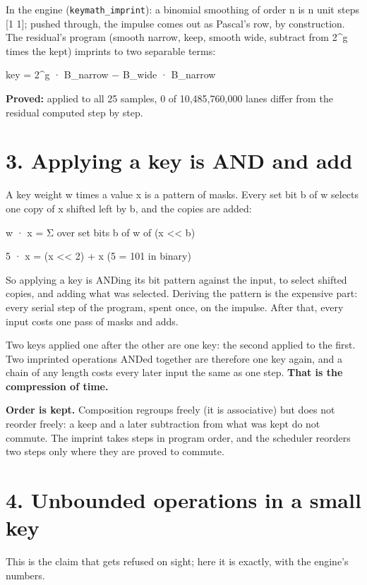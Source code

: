 In the engine (\texttt{keymath\_\allowbreak{}imprint}): a binomial smoothing of order n is n unit steps [1 1]; pushed through, the impulse comes out as Pascal's row, by construction. The residual's program (smooth narrow, keep, smooth wide, subtract from 2\textasciicircum{}g times the kept) imprints to two separable terms:

key = 2\textasciicircum{}g · B\_\allowbreak{}narrow − B\_\allowbreak{}wide · B\_\allowbreak{}narrow

\textbf{Proved:} applied to all 25 samples, 0 of 10,485,760,000 lanes differ from the residual computed step by step.

\section{\texorpdfstring{3. Applying a key is AND and add}{3. Applying a key is AND and add}}

A key weight w times a value x is a pattern of masks. Every set bit b of w selects one copy of x shifted left by b, and the copies are added:

w · x = Σ over set bits b of w of (x << b)

5 · x = (x << 2) + x         (5 = 101 in binary)

So applying a key is ANDing its bit pattern against the input, to select shifted copies, and adding what was selected. Deriving the pattern is the expensive part: every serial step of the program, spent once, on the impulse. After that, every input costs one pass of masks and adds.

Two keys applied one after the other are one key: the second applied to the first. Two imprinted operations ANDed together are therefore one key again, and a chain of any length costs every later input the same as one step. \textbf{That is the compression of time.}

\textbf{Order is kept.} Composition regroups freely (it is associative) but does not reorder freely: a keep and a later subtraction from what was kept do not commute. The imprint takes steps in program order, and the scheduler reorders two steps only where they are proved to commute.

\section{\texorpdfstring{4. Unbounded operations in a small key}{4. Unbounded operations in a small key}}

This is the claim that gets refused on sight; here it is exactly, with the engine's numbers.

